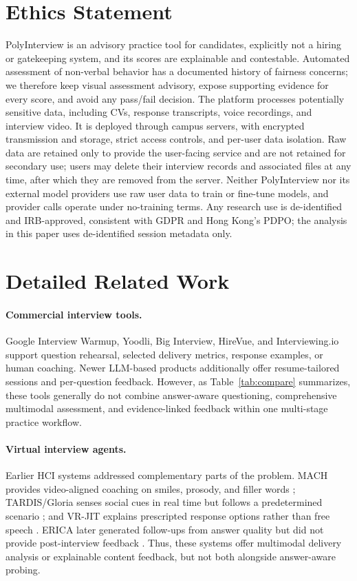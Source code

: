\documentclass[11pt]{article}
\begin{document}
\section*{Ethics Statement}
PolyInterview is an advisory practice tool for candidates, explicitly not a hiring or gatekeeping system, and its scores are explainable and contestable. Automated assessment of non-verbal behavior has a documented history of fairness concerns; we therefore keep visual assessment advisory, expose supporting evidence for every score, and avoid any pass/fail decision. The platform processes potentially sensitive data, including CVs, response transcripts, voice recordings, and interview video. It is deployed through campus servers, with encrypted transmission and storage, strict access controls, and per-user data isolation. Raw data are retained only to provide the user-facing service and are not retained for secondary use; users may delete their interview records and associated files at any time, after which they are removed from the server. Neither PolyInterview nor its external model providers use raw user data to train or fine-tune models, and provider calls operate under no-training terms. Any research use is de-identified and IRB-approved, consistent with GDPR and Hong Kong's PDPO; the analysis in this paper uses de-identified session metadata only.



\clearpage
\appendix
\section{Detailed Related Work}
\label{app:related}

\paragraph{Commercial interview tools.} Google Interview Warmup, Yoodli, Big Interview, HireVue, and Interviewing.io support question rehearsal, selected delivery metrics, response examples, or human coaching. Newer LLM-based products additionally offer resume-tailored sessions and per-question feedback. However, as Table~\ref{tab:compare} summarizes, these tools generally do not combine answer-aware questioning, comprehensive multimodal assessment, and evidence-linked feedback within one multi-stage practice workflow.

\paragraph{Virtual interview agents.} Earlier HCI systems addressed complementary parts of the problem. MACH provides video-aligned coaching on smiles, prosody, and filler words \citep{hoque2013mach}; TARDIS/Gloria senses social cues in real time but follows a predetermined scenario \citep{anderson2013tardis,baur2013job,langer2016dear}; and VR-JIT explains prescripted response options rather than free speech \citep{smith2014virtual}. ERICA later generated follow-ups from answer quality but did not provide post-interview feedback \citep{inoue2020jobinterviewer}. Thus, these systems offer multimodal delivery analysis or explainable content feedback, but not both alongside answer-aware probing.
\end{document}
